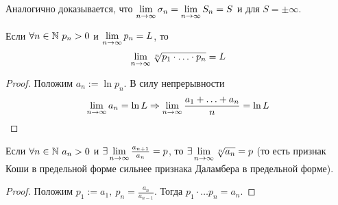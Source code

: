 \begin{note}
	Аналогично доказывается, что $\lim\limits_{n \to \infty} \sigma_n = \lim\limits_{n \to \infty} S_n = S$ и для $S = \pm \infty$.
\end{note}

\begin{corollary}
	Если $\forall n \in \mathbb{N}\ p_n > 0$ и $\lim\limits_{n \to \infty} p_n = L$, то
	\[
		\lim\limits_{n \to \infty} \sqrt[n]{p_1 \cdot \ldots \cdot p_n} = L
	\]
\end{corollary}

\begin{proof}
	Положим $a_n := \ln p_n$. В силу непрерывности
	\[
		\lim\limits_{n \to \infty} a_n = \ln L \Rightarrow \lim\limits_{n \to \infty} \frac{a_1 + \ldots + a_n}{n} = \ln L
	\]
\end{proof}

\begin{corollary}
	Если $\forall n \in \mathbb{N}\ a_n > 0$ и $\exists \lim\limits_{n \to \infty} \frac{a_{n + 1}}{a_n} = p$, то $\exists \lim\limits_{n \to \infty} \sqrt[n]{a_n} = p$ (то есть признак Коши в предельной форме сильнее признака Даламбера в предельной форме).
\end{corollary}

\begin{proof}
	Положим $p_1 := a_1,\ p_n = \frac{a_n}{a_{n - 1}}$. Тогда $p_1 \cdot \ldots p_n = a_n$.
\end{proof}